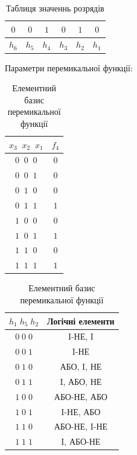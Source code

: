 \documentclass[12pt,a4paper]{article}
\begin{document}
    \begin{table}[h]
        \centering
        \renewcommand{\arraystretch}{1.3}
        \begin{tabular}{|cccccc|}
        \hline
        $0$ & $0$ & $1$ & $0$ & $1$ & $0$ \\
        \hline
        $h_6$ & $h_5$ & $h_4$ & $h_3$ & $h_2$ & $h_1$ \\
        \hline
        \end{tabular}
        \caption{Таблиця значеннь розрядів}
    \end{table}

    \noindent
    Параметри перемикальної функції:

    \begin{table}[h]
        \centering

        \begin{minipage}[t]{0.48\textwidth}
        \centering
        \renewcommand{\arraystretch}{1.2}
        \begin{tabular}{|c|c|}
        \hline
        $x_3\;\;x_2\;\;x_1$ & $f_4$ \\
        \hline
        $0\;\;0\;\;0$ & $0$ \\
        $0\;\;0\;\;1$ & $0$ \\
        $0\;\;1\;\;0$ & $0$ \\
        $0\;\;1\;\;1$ & $1$ \\
        $1\;\;0\;\;0$ & $0$ \\
        $1\;\;0\;\;1$ & $1$ \\
        $1\;\;1\;\;0$ & $0$ \\
        $1\;\;1\;\;1$ & $1$ \\
        \hline
        \end{tabular}
        \caption{Таблиця істинності функції $f_4$}
        \end{minipage}
        \hfill
        \begin{minipage}[t]{0.48\textwidth}
        \centering
        \renewcommand{\arraystretch}{1.4}
        \begin{tabular}{|c|c|}
        \hline
        \textbf{$h_1\;h_5\;h_2$} & \textbf{Логічні елементи} \\
        \hline
        $0\;0\;0$ & I-НЕ, I \\
        \hline
        \rowcolor{yellow!35}
        $0\;0\;1$ & I-НЕ \\
        \hline
        $0\;1\;0$ & АБО, I, НЕ \\
        \hline
        $0\;1\;1$ & I, АБО, НЕ \\
        \hline
        $1\;0\;0$ & АБО-НЕ, АБО \\
        \hline
        $1\;0\;1$ & I-НЕ, АБО \\
        \hline
        $1\;1\;0$ & АБО-НЕ, I-НЕ \\
        \hline
        $1\;1\;1$ & I, АБО-НЕ \\
        \hline
        \end{tabular}
        \caption{Елементний базис перемикальної функції}
        \end{minipage}

    \end{table}
\end{document}
